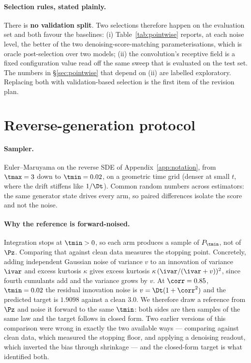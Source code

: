 \paragraph{Selection rules, stated plainly.} There is \textbf{no validation split}. Two selections
therefore happen on the evaluation set and both favour the baselines: (i) Table~\ref{tab:pointwise}
reports, at each noise level, the better of the two denoising-score-matching parameterisations,
which is oracle post-selection over two models; (ii) the convolution's receptive field is a fixed
configuration value read off the same sweep that is evaluated on the test set. The numbers in
\S\ref{sec:pointwise} that depend on (ii) are labelled exploratory. Replacing both with
validation-based selection is the first item of the revision plan.

\section{Reverse-generation protocol}
\label{app:reverse}

\paragraph{Sampler.} Euler--Maruyama on the reverse SDE of Appendix~\ref{app:notation}, from
$\tmax=3$ down to $\tmin=0.02$, on a geometric time grid (denser at small $t$, where the drift
stiffens like $1/\Dt$). Common random numbers across estimators: the same generator state drives
every arm, so paired differences isolate the score and not the noise.

\paragraph{Why the reference is forward-noised.} Integration stops at $\tmin>0$, so each arm
produces a sample of $P_{\tmin}$, not of $\Pz$. Comparing that against clean data measures the
stopping point. Concretely, adding independent Gaussian noise of variance $v$ to an innovation of
variance $\ivar$ and excess kurtosis $\kappa$ gives excess kurtosis
$\kappa\,(\ivar/(\ivar+v))^2$, since fourth cumulants add and the variance grows by $v$. At
$\corr=0.85$, $\tmin=0.02$ the residual innovation noise is $v = \Dt(1+\corr^2)$ and the
predicted target is $1.9098$ against a clean $3.0$. We therefore draw a reference from $\Pz$ and
noise it forward to the same $\tmin$: both sides are then samples of the same law and the target
follows in closed form. Two earlier versions of this comparison were wrong in exactly the two
available ways --- comparing against clean data, which measured the stopping floor, and applying
a denoising readout, which inverted the bias through shrinkage --- and the closed-form target is
what identified both.


